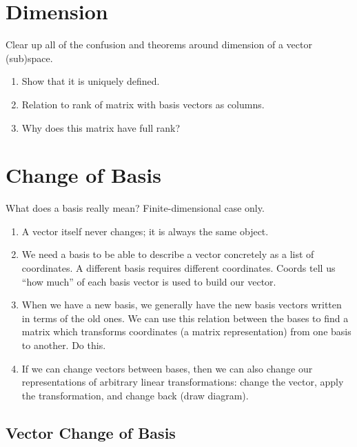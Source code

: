 
\chapter{Dimension}
Clear up all of the confusion and theorems around dimension of a vector (sub)space.
\begin{enumerate}
	\item Show that it is uniquely defined. 
	\item Relation to rank of matrix with basis vectors as columns.
	\item Why does this matrix have full rank?
\end{enumerate}



\chapter{Change of Basis}
What does a basis really mean? Finite-dimensional case only.
\begin{enumerate}
	\item A vector itself never changes; it is always the same object.
	\item We need a basis to be able to describe a vector concretely as a list of coordinates. A different basis requires different coordinates. Coords tell us ``how much'' of each basis vector is used to build our vector.
	\item When we have a new basis, we generally have the new basis vectors written in terms of the old ones. We can use this relation between the bases to find a matrix which transforms coordinates (a matrix representation) from one basis to another. Do this.
	\item If we can change vectors between bases, then we can also change our representations of arbitrary linear transformations: change the vector, apply the transformation, and change back (draw diagram).
\end{enumerate}


\section{Vector Change of Basis}
\label{sec:cob-lt}

